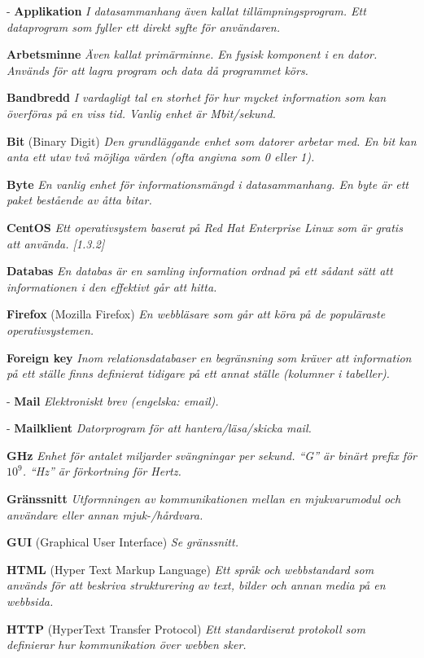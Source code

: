 \documentclass[a4paper, twoside, 11pt, titlepage]{article}
\begin{document}
	- \textbf{Applikation} \emph{I datasammanhang även kallat tillämpningsprogram. Ett dataprogram som fyller ett direkt syfte för användaren.}

	\textbf{Arbetsminne} \emph{Även kallat primärminne. En fysisk komponent i en dator. Används för att lagra program och data då programmet körs.}

	\textbf{Bandbredd} \emph{I vardagligt tal en storhet för hur mycket information som kan överföras på en viss tid. Vanlig enhet är Mbit/sekund.}

	\textbf{Bit} (Binary Digit) \emph{Den grundläggande enhet som datorer arbetar med. En bit kan anta ett utav två möjliga värden (ofta angivna som 0 eller 1).}

	\textbf{Byte} \emph{En vanlig enhet för informationsmängd i datasammanhang. En byte är ett paket bestående av åtta bitar.}

	\textbf{CentOS} \emph{Ett operativsystem baserat på Red Hat Enterprise Linux som är gratis att använda. [1.3.2]}

	\textbf{Databas} \emph{En databas är en samling information ordnad på ett sådant sätt att informationen i den effektivt går att hitta.}

	\textbf{Firefox} (Mozilla Firefox) \emph{En webbläsare som går att köra på de populäraste operativsystemen.}

	\textbf{Foreign key} \emph{Inom relationsdatabaser en begränsning som kräver att information på ett ställe finns definierat tidigare på ett annat ställe (kolumner i tabeller).}

	- \textbf{Mail} \emph{Elektroniskt brev (engelska: email).}

	- \textbf{Mailklient} \emph{Datorprogram för att hantera/läsa/skicka mail.}

	\textbf{GHz} \emph{Enhet för antalet miljarder svängningar per sekund. ``G'' är binärt prefix för $10^{9}$. ``Hz'' är förkortning för Hertz.}

	\textbf{Gränssnitt} \emph{Utformningen av kommunikationen mellan en mjukvarumodul och användare eller annan mjuk-/hårdvara.}

	\textbf{GUI} (Graphical User Interface) \emph{Se gränssnitt.}

	\textbf{HTML} (Hyper Text Markup Language) \emph{Ett språk och webbstandard som används för att beskriva strukturering av text, bilder och annan media på en webbsida.}

	\textbf{HTTP} (HyperText Transfer Protocol) \emph{Ett standardiserat protokoll som definierar hur kommunikation över webben sker.}
\end{document}
